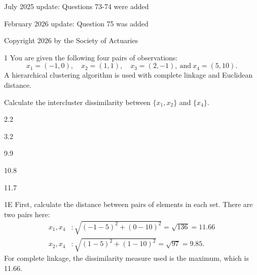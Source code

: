 July 2025 update: Questions 73-74 were added

February 2026 update: Question 75 was added

Copyright 2026 by the Society of Actuaries


\begin{question}{1}
You are given the following four pairs of observations:
\[ x_1 = (-1, 0),\quad x_2 = (1, 1),\quad x_3 = (2, -1),\ \text{and}\ x_4 = (5, 10). \]
A hierarchical clustering algorithm is used with complete linkage and Euclidean distance.

Calculate the intercluster dissimilarity between $\{x_1, x_2\}$ and $\{x_4\}$.

\begin{choices}
\item 2.2
\item 3.2
\item 9.9
\item 10.8
\item 11.7
\end{choices}
\end{question}
\begin{solution}{1}{E}
First, calculate the distance between pairs of elements in each set. There are two pairs here:
\begin{align*}
x_1, x_4 &: \sqrt{(-1-5)^2 + (0-10)^2} = \sqrt{136} = 11.66 \\
x_2, x_4 &: \sqrt{(1-5)^2 + (1-10)^2} = \sqrt{97} = 9.85.
\end{align*}
For complete linkage, the dissimilarity measure used is the maximum, which is 11.66.
\end{solution}

